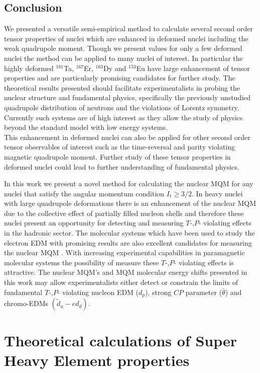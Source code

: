 \documentclass[8pt,a4paper, twoside]{report}
\begin{document}
\chapter{Conclusion}

We presented a versatile semi-empirical method to calculate several second order tensor properties of nuclei which are enhanced in deformed nuclei including the weak quadrupole moment. Though we present values for only a few deformed nuclei the method can be applied to many nuclei of interest. In particular the highly deformed $^{181}$Ta, $^{167}$Er, $^{163}$Dy and $^{153}$Eu have large enhancement of tensor properties and are particularly promising candidates for further study. The theoretical results presented should facilitate experimentalists in probing the nuclear structure and fundamental physics, specifically the previously unstudied quadrupole distribution of neutrons and the violations of Lorentz symmetry. Currently such systems are of high interest  as they allow the study of physics beyond the standard model with low energy systems. \\

This enhancement in deformed nuclei can also be applied for other second order tensor observables of interest such as the time-reversal and parity violating magnetic quadrupole moment. Further study of these tensor properties in deformed nuclei  could lead to further understanding of fundamental physics.

In this work we present a novel method for calculating the nuclear MQM for any nuclei that satisfy the angular momentum condition $I_t \geq 3/2$. In heavy nuclei with large quadrupole deformations there is an enhancement of the nuclear MQM  due to the collective effect of partially filled nucleon shells and therefore these nuclei present an opportunity for detecting and measuring $T$-,$P$- violating effects in the hadronic sector. The molecular systems which have been used to study the electron EDM with promising results are also excellent candidates for measuring the nuclear MQM  \cite{Skripnikov2017, Skripnikov2014ThO}. With increasing experimental capabilities  in paramagnetic molecular systems the possibility of measure these $T$-,$P$- violating effects is attractive. The nuclear MQM's and MQM molecular energy shifts presented in this work may allow experimentalists either detect or constrain the limits of fundamental $T$-,$P$- violating nucleon EDM ($d_p$), strong $CP$ parameter ($\bar{\theta}$) and chromo-EDMs $(\tilde{d}_{u} - e{d}_d) $. 
\part{Theoretical calculations of Super Heavy Element properties}
\end{document}
